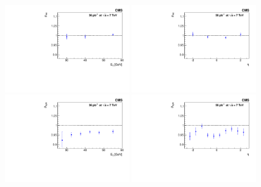 \begin{figure}[htbp]
\begin{center}
  \includegraphics[width=0.48\textwidth]{figs/recoeff_scalept.pdf}
  \includegraphics[width=0.48\textwidth]{figs/recoeff_scaleeta.pdf}
  \includegraphics[width=0.48\textwidth]{figs/eleideff_scalept.pdf}
  \includegraphics[width=0.48\textwidth]{figs/eleideff_scaleeta.pdf}

\end{center}
\end{figure}
